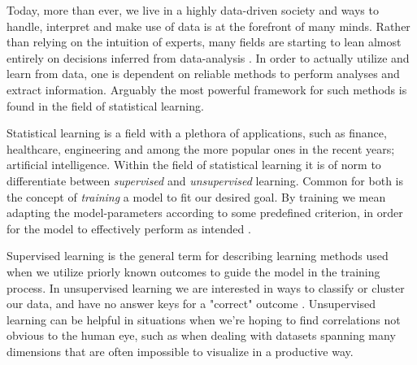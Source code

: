 




Today, more than ever, we live in a highly data-driven society and ways to handle, interpret and make use of data is at the forefront of many minds. 
Rather than relying on the intuition of experts, many fields are starting to lean almost entirely on decisions inferred from data-analysis \cite{foster,Kitchin}.
In order to actually utilize and learn from data, one is dependent on reliable methods to perform analyses and extract information. 
Arguably the most powerful framework for such methods is found in the field of statistical learning. 

Statistical learning is a field with a plethora of applications, such as finance, healthcare, engineering and among the more popular ones in the recent years; artificial intelligence. 
Within the field of statistical learning it is of norm to differentiate between \textit{supervised} and \textit{unsupervised} learning. 
Common for both is the concept of \textit{training} a model to fit our desired goal. 
By training we mean adapting the model-parameters according to some predefined criterion, in order for the model to effectively perform as intended \citep[ p.~1]{hastie}.


Supervised learning is the general term for describing learning methods used when we utilize priorly known outcomes to guide the model in the training process. 
In unsupervised learning we are interested in ways to classify or cluster our data, and have no answer keys for a "correct" outcome \citep[ p.~1]{hastie}.
Unsupervised learning can be helpful in situations when we're hoping to find correlations not obvious to the human eye, such as when dealing with datasets spanning many dimensions that are often impossible to visualize in a productive way.

